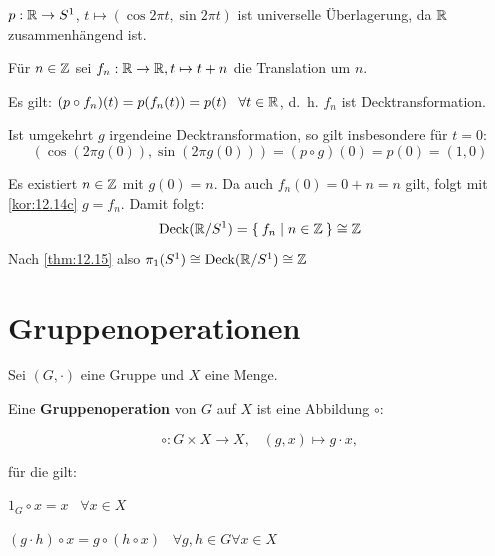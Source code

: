 \begin{beispiel}
    $p: \mathbb{R} \rightarrow S^1$, $t \mapsto (\cos 2 \pi t, \sin 2 \pi t)$
    ist universelle Überlagerung, da $\mathbb{R}$ zusammenhängend ist.

    Für $n \in \mathbb{Z}$ sei $f_n: \mathbb{R} \rightarrow \mathbb{R}, t \mapsto t + n$
    die Translation um $n$.

    Es gilt: $(p \circ f_n)(t) = p(f_n(t)) = p(t) \;\;\; \forall t \in \mathbb{R}$,
    d.~h. $f_n$ ist Decktransformation.

    Ist umgekehrt $g$ irgendeine Decktransformation, so gilt insbesondere
    für $t=0$:
    \[(\cos(2 \pi g(0)), \sin(2 \pi g(0))) = (p \circ g)(0) = p(0) = (1,0)\]

    Es existiert $n \in \mathbb{Z}$ mit $g(0) = n$. Da auch $f_n(0) = 0 + n = n$
    gilt, folgt mit \cref{kor:12.14c} $g = f_n$. Damit folgt:
    \[\operatorname{Deck}(\mathbb{R}/S^1) = \Set{f_n | n \in \ensuremath{\mathbb{Z}}} \cong \mathbb{Z}\]
    Nach \cref{thm:12.15} also $\pi_1(S^1) \cong \operatorname{Deck}(\mathbb{R}/S^1) \cong \mathbb{Z}$
\end{beispiel}

\section{Gruppenoperationen}
\begin{definition}%
    Sei $(G, \cdot)$ eine Gruppe und $X$ eine Menge.

    Eine \textbf{Gruppenoperation} von $G$ auf
    $X$ ist eine Abbildung $\circ$:
    
    \[ \circ: G \times X \rightarrow X,\;\;\; (g,x) \mapsto g \cdot x,\]

    für die gilt:
    \begin{defenum}
        \item $1_G \circ x = x \;\;\; \forall x \in X$\label{def:gruppenoperation.1}
        \item $(g \cdot h) \circ x = g \circ (h \circ x) \;\;\; \forall g,h \in G \forall x \in X$\label{def:gruppenoperation.2}
    \end{defenum}
\end{definition}

